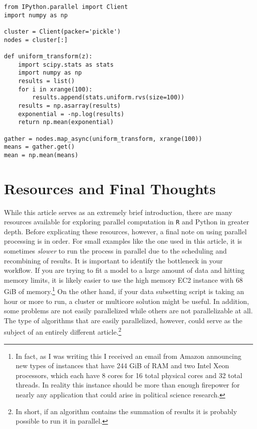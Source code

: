 \documentclass[12pt, letterpaper]{article}
\begin{document}
\begin{lstlisting}
from IPython.parallel import Client
import numpy as np

cluster = Client(packer='pickle')
nodes = cluster[:]

def uniform_transform(z):
    import scipy.stats as stats
    import numpy as np
    results = list()
    for i in xrange(100):
        results.append(stats.uniform.rvs(size=100))
    results = np.asarray(results)
    exponential = -np.log(results)
    return np.mean(exponential)

gather = nodes.map_async(uniform_transform, xrange(100))
means = gather.get()
mean = np.mean(means)

\end{lstlisting}

\section*{Resources and Final Thoughts}

While this article serves as an extremely brief introduction, there are 
many resources available for exploring parallel computation in \texttt{R} and Python 
in greater depth. Before explicating these resources, however, a final note 
on using parallel processing is in order. For small 
examples like the one used in this article, it is sometimes \emph{slower} to run 
the process in parallel due to the scheduling and recombining of results. It is 
important to identify the bottleneck in your workflow. If you are trying to fit a 
model to a large amount of data and hitting memory limits, it is likely easier 
to use the high memory EC2 instance with 68 GiB of memory.\footnote{In fact, 
as I was writing this I received an email from Amazon announcing new types
of instances that have 244 GiB of RAM and two Intel Xeon processors, which
each have 8 cores for 16 total physical cores and 32 total threads. In reality 
this instance should be more than enough firepower for nearly any application
that could arise in political science research.} 
On the other hand, if your data subsetting script is taking an hour or more to run, a cluster or multicore solution might be 
useful. In addition, some problems are not easily parallelized while others are 
not parallelizable at all. The type of algorithms that are easily parallelized, however,
 could serve as the subject of an entirely different article.\footnote{In short, if an algorithm contains the summation of results it is probably 
 possible to run it in parallel.} 
 
\end{document}

